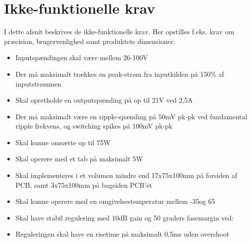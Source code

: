 \section{Ikke-funktionelle krav}
I dette afsnit beskrives de ikke-funktionelle krav. Her opstilles f.eks. krav om præcision, brugervenlighed samt produktets dimensioner.
\begin{itemize}
			\item Inputspændingen skal være mellem 26-100V
			\item Der må maksimalt trækkes en peak-strøm fra inputkilden på 150\% af inputstrømmen
			\item Skal opretholde en outputspænding på op til 21V ved 2,5A
			\item Der må maksimalt være en ripple-spænding på 50mV pk-pk ved fundamental ripple frekvens, og switching spikes på 100mV pk-pk
			\item Skal kunne omsætte op til 75W
			\item Skal operere med et tab på maksimalt 5W %
			\item Skal implementeres i et volumen mindre end 17x75x100mm på forsiden af PCB, samt 3x75x100mm på bagsiden PCB'et
			\item Skal kunne operere med en omgivelsestemperatur mellem -35\degreeCelsius  og 65\degreeCelsius
			\item Skal have stabil regulering med 10dB gain og 50 graders fasemargin ved:
			\item Reguleringen skal have en risetime på maksimalt 0,5ms uden overshoot
					
\end{itemize}
